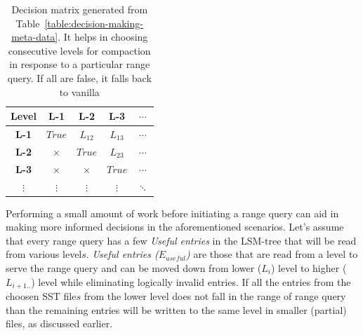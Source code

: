 \begin{table}
    \begin{tabular}{ |c|c|c|c|c| }
        \hline
        \hspace*{4.1mm}\textbf{Level}\hspace*{4.1mm} & \hspace*{4.1mm}\textbf{L-1}\hspace*{4.1mm} & \hspace*{4.1mm}\textbf{L-2}\hspace*{4.1mm} & \hspace*{4.1mm}\textbf{L-3}\hspace*{4.1mm} & \hspace*{4mm}$\cdots$\hspace*{4mm} \\
        \hline
        \textbf{L-1} & $True$ & $L_{12}$ & $L_{13}$ & $\cdots$ \\
        \hline
        \textbf{L-2} & $\times$ & $True$ & $L_{23}$ & $\cdots$ \\
        \hline
        \textbf{L-3} &  $\times$ &  $\times$ & $True$ & $\cdots$ \\
        \hline
        $\vdots$ &  $\vdots$ &  $\vdots$ & $\vdots$ & $\ddots$ \\
        \hline
    \end{tabular}
    \caption{Decision matrix generated from Table~\ref{table:decision-making-meta-data}. It helps in choosing consecutive levels for compaction in response to a particular range query. If all are false, it falls back to vanilla}
    \label{table:decision-matrix}
\end{table}

Performing a small amount of work before initiating a range query can aid in making more informed decisions in the 
aforementioned scenarios. Let's assume that every range query has a few \textit{Useful entries} in the LSM-tree that will 
be read from various level\(s\). \textit{Useful entries ($E_{useful}$)} are those that are read from a level to serve the range 
query and can be moved down from lower ($L_i$) level to higher ($L_{i+1..}$) level while eliminating logically invalid entries.
If all the entries from the choosen SST file\(s\) from the lower level does not fall in the range of range query than the remaining entries 
will be written to the same level in smaller (partial) files, as discussed earlier.

